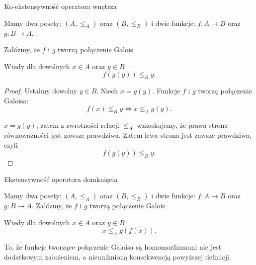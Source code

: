 \begin{lemma}{Ko-ekstensywność operatora wnętrza}

	Mamy dwa posety: $\left( A, \le _A \right) $ oraz $\left( B, \le _B \right)$ i dwie funkcje: $f: A \rightarrow B$ oraz $g: B \rightarrow A$.

	Załóżmy, że $f$ i  $g$ tworzą połączenie Galois. 

	Wtedy dla dowolnych $x\in A$ oraz $y \in B$
	\[
	f(g(y)) \le_B  y
	.\] 
\end{lemma}
\begin{proof}
	
	Ustalmy dowolny $y \in B$. Niech $x = g(y)$. Funkcje $f$ i $g$ tworzą połączenie Galoisa:
	\[
	f(x) \le _B y \iff x \le_A g(y)
	.\]

	$x = g(y)$, zatem z zwrotności relacji $\le _A$ wnioskujemy, że prawa strona równoważności jest zawsze prawdziwa. Zatem lewa strona jest zawsze prawdziwa, czyli 
	\[
	f(g(y)) \le _B y
	.\] 
\end{proof}
\begin{lemma}{Ekstensywność operatora domknięcia}
	
	Mamy dwa posety: $\left( A, \le _A \right) $ oraz $\left( B, \le _B \right)$ i dwie funkcje: $f: A \rightarrow B$ oraz $g: B \rightarrow A$.
	Załóżmy, że $f$ i  $g$ tworzą połączenie Galois 

	Wtedy dla dowolnych $x\in A$ oraz $y \in B$
	\[
		x \le _A g (f (x))
	.\] 
\end{lemma}
\begin{remark}

	To, że funkcje tworzące połączenie Galoisa są homomorfizmami nie jest dodatkowym założeniem, a nieuniknioną konsekwencją powyższej definicji. 
\end{remark}

